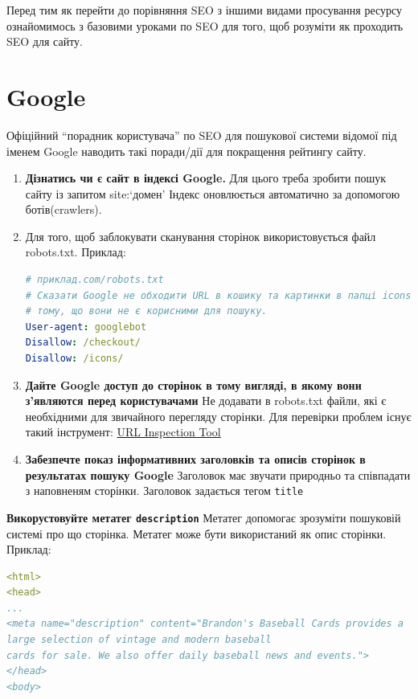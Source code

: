 \documentclass[a4paper,12pt, titlepage]{article}
\begin{document}
    Перед тим як перейти до порівняння SEO з іншими видами просування ресурсу ознайомимось з базовими уроками по SEO
    для того, щоб розуміти як проходить SEO для сайту.
    \section{Google}
    Офіційний ``порадник користувача'' по SEO для пошукової системи відомої під іменем Google наводить такі поради/дії
    для покращення рейтингу сайту.
    \begin{enumerate}
        \item \textbf{Дізнатись чи є сайт в індексі Google.}
        Для цього треба зробити пошук сайту із запитом site:`домен'
        Індекс оновлюється автоматично за допомогою ботів(crawlers).
        \item Для того, щоб заблокувати сканування сторінок використовується файл robots.txt. Приклад:
        \begin{lstlisting}[language=yaml, basicstyle=\small, texcl=true]
# приклад.com/robots.txt
# Сказати Google не обходити URL в кошику та картинки в папці icons
# тому, що вони не є корисними для пошуку.
User-agent: googlebot
Disallow: /checkout/
Disallow: /icons/
        \end{lstlisting}

        \item \textbf{Дайте Google доступ до сторінок в тому вигляді, в якому вони з'являются перед користувачами}
        Не додавати в robots.txt файли, які є необхідними для звичайного перегляду сторінки.
        Для перевірки проблем існує такий інструмент: \href{https://support.google.com/webmasters/answer/9012289}{URL Inspection Tool}
        \item \textbf{Забезпечте показ інформативних заголовків та описів сторінок в результатах пошуку Google}
        Заголовок має звучати природньо та співпадати з наповненям сторінки. Заголовок задається тегом \texttt{title}
    \end{enumerate}
    \item \textbf{Викорустовуйте метатег \texttt{description}}
    Метатег допомогає зрозуміти пошуковій системі про що сторінка. Метатег може бути використаний як опис сторінки.
    Приклад:
    \begin{lstlisting}[language=yaml, basicstyle=\small, texcl=true]
<html>
<head>
...
<meta name="description" content="Brandon's Baseball Cards provides a
large selection of vintage and modern baseball
cards for sale. We also offer daily baseball news and events.">
</head>
<body>
    \end{lstlisting}
\end{document}
